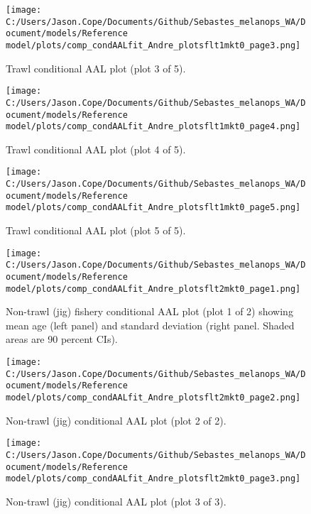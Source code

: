\documentclass[11pt,
  english,
  letterpaper,
]{article}
\begin{document}
\begin{figure}
\centering
\texttt{[image: C:/Users/Jason.Cope/Documents/Github/Sebastes\_melanops\_WA/Document/models/Reference model/plots/comp\_condAALfit\_Andre\_plotsflt1mkt0\_page3.png]}
\caption{Trawl conditional AAL plot (plot 3 of 5).\label{fig:comp_condAALfit_Andre_plotsflt1mkt0_page3}}
\end{figure}

\begin{figure}
\centering
\texttt{[image: C:/Users/Jason.Cope/Documents/Github/Sebastes\_melanops\_WA/Document/models/Reference model/plots/comp\_condAALfit\_Andre\_plotsflt1mkt0\_page4.png]}
\caption{Trawl conditional AAL plot (plot 4 of 5).\label{fig:comp_condAALfit_Andre_plotsflt1mkt0_page4}}
\end{figure}

\begin{figure}
\centering
\texttt{[image: C:/Users/Jason.Cope/Documents/Github/Sebastes\_melanops\_WA/Document/models/Reference model/plots/comp\_condAALfit\_Andre\_plotsflt1mkt0\_page5.png]}
\caption{Trawl conditional AAL plot (plot 5 of 5).\label{fig:comp_condAALfit_Andre_plotsflt1mkt0_page5}}
\end{figure}

\begin{figure}
\centering
\texttt{[image: C:/Users/Jason.Cope/Documents/Github/Sebastes\_melanops\_WA/Document/models/Reference model/plots/comp\_condAALfit\_Andre\_plotsflt2mkt0\_page1.png]}
\caption{Non-trawl (jig) fishery conditional AAL plot (plot 1 of 2) showing mean age (left panel) and standard deviation (right panel. Shaded areas are 90 percent CIs).\label{fig:comp_condAALfit_Andre_plotsflt2mkt0_page1}}
\end{figure}

\begin{figure}
\centering
\texttt{[image: C:/Users/Jason.Cope/Documents/Github/Sebastes\_melanops\_WA/Document/models/Reference model/plots/comp\_condAALfit\_Andre\_plotsflt2mkt0\_page2.png]}
\caption{Non-trawl (jig) conditional AAL plot (plot 2 of 2).\label{fig:comp_condAALfit_Andre_plotsflt2mkt0_page2}}
\end{figure}

\begin{figure}
\centering
\texttt{[image: C:/Users/Jason.Cope/Documents/Github/Sebastes\_melanops\_WA/Document/models/Reference model/plots/comp\_condAALfit\_Andre\_plotsflt2mkt0\_page3.png]}
\caption{Non-trawl (jig) conditional AAL plot (plot 3 of 3).\label{fig:comp_condAALfit_Andre_plotsflt2mkt0_page3}}
\end{figure}
\end{document}
